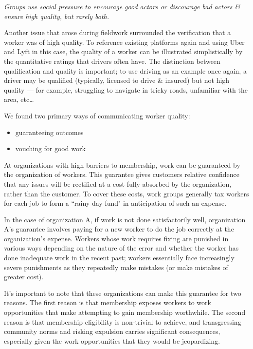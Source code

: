 \textit{Groups use social pressure to encourage good actors or discourage bad actors \& ensure high quality, but rarely both.}


Another issue that arose during fieldwork surrounded the verification that a worker was of high quality.
To reference existing platforms again and using Uber and Lyft in this case, the quality of a worker can be illustrated simplistically by the quantitative ratings that drivers often have.
The distinction between qualification and quality is important;
to use driving as an example once again, a driver may be qualified (typically, licensed to drive \& insured) but not high quality
--- for example, struggling to navigate in tricky roads, unfamiliar with the area, etc\dots

We found two primary ways of communicating worker quality:
\begin{itemize} \itemsep0pt \parskip0pt
  \item guaranteeing outcomes
  \item vouching for good work
\end{itemize}

At organizations with high barriers to membership, work can be guaranteed by the organization of workers.
This guarantee gives customers relative confidence that any issues will be rectified at a cost fully absorbed by the organization, rather than the customer.
To cover these costs, work groups generally tax workers for each job to form a ``rainy day fund" in anticipation of such an expense.

In the case of organization A, if work is not done satisfactorily well, organization A's guarantee involves paying for a new worker to do the job correctly at the organization's expense.
Workers whose work requires fixing are punished in various ways depending on the nature of the error and whether the worker has done inadequate work in the recent past;
workers essentially face increasingly severe punishments as they repeatedly make mistakes (or make mistakes of greater cost).

It's important to note that these organizations can make this guarantee for two reasons.
The first reason is that membership exposes workers to work opportunities that make attempting to gain membership worthwhile.
The second reason is that membership eligibility is non-trivial to achieve, and transgressing community norms and risking expulsion carries significant consequences, especially given the work opportunities that they would be jeopardizing.

